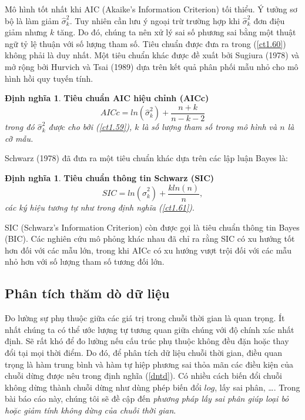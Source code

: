 \documentclass[12pt, a4paper,oneside]{book}
\theoremstyle{definition}
\newtheorem{dn}[theo]{Định nghĩa}
\begin{document}
Mô hình tốt nhất khi AIC (Akaike's Information Criterion) tối thiểu. Ý tưởng sơ bộ là làm giảm $\widehat{\sigma}_{k}^{2}$. Tuy nhiên cần lưu ý ngoại trừ trường hợp khi $ \widehat{\sigma}_{k}^{2} $ đơn điệu giảm nhưng $ k $ tăng. Do đó, chúng ta nên xử lý sai số phương sai  bằng một thuật ngữ tỷ lệ thuận với số lượng tham số. Tiêu chuẩn được đưa ra trong (\ref{ct1.60}) không phải là duy nhất. Một tiêu chuẩn khác được đề xuất bởi Sugiura (1978) và mở rộng bởi Hurvich và Tsai (1989) dựa trên kết quả phân phối mẫu nhỏ cho mô hình hồi quy tuyến tính.
\begin{dn}\cite{1} \textbf{Tiêu chuẩn AIC hiệu chỉnh (AICc)}
	\textit{\begin{equation}
		AICc= ln (\widehat{\sigma}_{k}^{2}) +\dfrac{n+ k}{n-k-2} \label{ct1.61}
		\end{equation} 
		trong đó $ \widehat{\sigma}_{k}^{2} $ được cho bởi (\ref{ct1.59}), $ k $ là số lượng tham số trong mô hình và $ n $ là cỡ mẫu.}	
\end{dn}
Schwarz (1978) đã đưa ra một tiêu chuẩn khác dựa trên các lập luận Bayes là:
\begin{dn}\cite{1} 	
	\textbf{Tiêu chuẩn thông tin Schwarz (SIC)} 
	\textit{\begin{equation}
		SIC= ln (\widehat{\sigma}_{k}^{2}) +\dfrac{kln(n)}{n}, \label{ct1.62}
		\end{equation}
		các ký hiệu tương tự như trong định nghĩa (\ref{ct1.61})}.
\end{dn}
SIC (Schwarz's Information Criterion) còn được gọi là tiêu chuẩn thông tin Bayes (BIC). Các nghiên cứu mô phỏng khác nhau đã chỉ ra rằng SIC có xu hướng tốt hơn đối với các mẫu lớn, trong khi AICc có xu hướng vượt trội đối với các mẫu nhỏ hơn với số lượng tham số tương đối lớn.
\subsection{Phân tích thăm dò dữ liệu}
Đo lường sự phụ thuộc giữa các giá trị trong chuỗi thời gian là quan trọng. Ít nhất chúng ta có thể ước lượng tự tương quan giữa chúng với độ chính xác nhất định. Sẽ rất khó để đo lường nếu cấu trúc phụ thuộc không đều đặn hoặc thay đổi tại mọi thời điểm. Do đó, để phân tích dữ liệu chuỗi thời gian, điều quan trọng là hàm trung bình và hàm tự hiệp phương sai thỏa mãn các điều kiện của chuỗi dừng được nêu trong định nghĩa (\ref{dntd}). Có nhiều cách biến đổi chuỗi không dừng thành chuỗi dừng như dùng phép biến đổi $log$, lấy sai phân, \dots. Trong bài báo cáo này, chúng tôi sẽ đề cập đến \textit{phương pháp lấy sai phân giúp loại bỏ hoặc giảm tính không dừng của chuỗi thời gian}.
\end{document}
